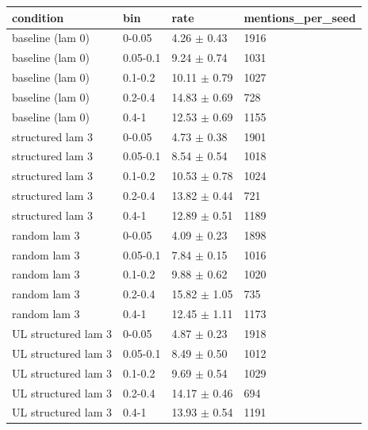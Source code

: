 \begin{tabular}{llll}
\hline
condition & bin & rate & mentions\_per\_seed \\
\hline
baseline (lam 0) & 0-0.05 & 4.26 $\pm$ 0.43 & 1916 \\
baseline (lam 0) & 0.05-0.1 & 9.24 $\pm$ 0.74 & 1031 \\
baseline (lam 0) & 0.1-0.2 & 10.11 $\pm$ 0.79 & 1027 \\
baseline (lam 0) & 0.2-0.4 & 14.83 $\pm$ 0.69 & 728 \\
baseline (lam 0) & 0.4-1 & 12.53 $\pm$ 0.69 & 1155 \\
structured lam 3 & 0-0.05 & 4.73 $\pm$ 0.38 & 1901 \\
structured lam 3 & 0.05-0.1 & 8.54 $\pm$ 0.54 & 1018 \\
structured lam 3 & 0.1-0.2 & 10.53 $\pm$ 0.78 & 1024 \\
structured lam 3 & 0.2-0.4 & 13.82 $\pm$ 0.44 & 721 \\
structured lam 3 & 0.4-1 & 12.89 $\pm$ 0.51 & 1189 \\
random lam 3 & 0-0.05 & 4.09 $\pm$ 0.23 & 1898 \\
random lam 3 & 0.05-0.1 & 7.84 $\pm$ 0.15 & 1016 \\
random lam 3 & 0.1-0.2 & 9.88 $\pm$ 0.62 & 1020 \\
random lam 3 & 0.2-0.4 & 15.82 $\pm$ 1.05 & 735 \\
random lam 3 & 0.4-1 & 12.45 $\pm$ 1.11 & 1173 \\
UL structured lam 3 & 0-0.05 & 4.87 $\pm$ 0.23 & 1918 \\
UL structured lam 3 & 0.05-0.1 & 8.49 $\pm$ 0.50 & 1012 \\
UL structured lam 3 & 0.1-0.2 & 9.69 $\pm$ 0.54 & 1029 \\
UL structured lam 3 & 0.2-0.4 & 14.17 $\pm$ 0.46 & 694 \\
UL structured lam 3 & 0.4-1 & 13.93 $\pm$ 0.54 & 1191 \\
\hline
\end{tabular}
